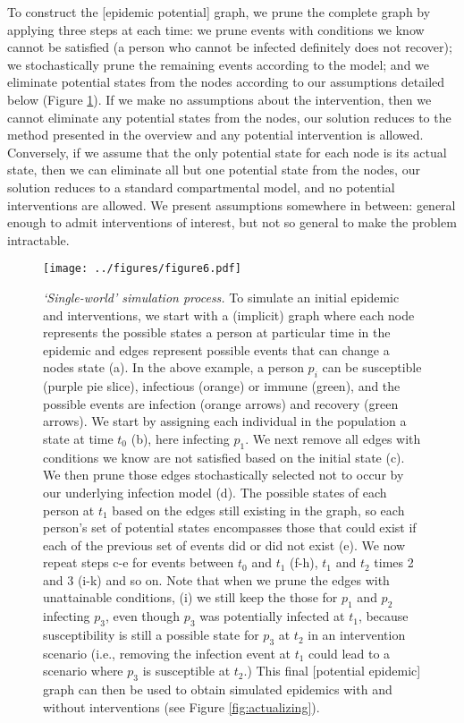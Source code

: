 \documentclass[PTRSB]{rsos}
\makeatletter
\def\checkGraphicsWidth{\ifdim\Gin@nat@width>\linewidth
	\tsGraphicsScaleX\linewidth\else\Gin@nat@width\fi}
\let\ts@includegraphics\includegraphics
\renewcommand{\includegraphics}[1]{\ts@includegraphics[width=\checkGraphicsWidth]{#1}}
\makeatother
\begin{document}
\begin{multicols}{2}
To construct the [epidemic potential] graph, we prune the complete graph by applying three steps at each time: we prune events with conditions we know cannot be satisfied (a person who cannot be infected definitely does not recover); we stochastically prune the remaining events according to the model; and we eliminate potential states from the nodes according to our assumptions detailed below (Figure \ref{fig:pruning}).
If we make no assumptions about the intervention, then we cannot eliminate any potential states from the nodes, our solution reduces to the method presented in the overview and any potential intervention is allowed.
Conversely, if we assume that the only potential state for each node is its actual state, then we can eliminate all but one potential state from the nodes, our solution reduces to a standard compartmental model, and no potential interventions are allowed.
We present assumptions somewhere in between: general enough to admit interventions of interest, but not so general to make the problem intractable.

\begin{figure}[hp]
\texttt{[image: ../figures/figure6.pdf]}
\caption{\textit{‘Single-world’ simulation process.}
  To simulate an initial epidemic and interventions, we start with a (implicit) graph where each node represents the possible states a person at particular time in the epidemic and edges represent possible events that can change a nodes state (a).
  In the above example, a person $p_i$ can be susceptible (purple pie slice), infectious (orange) or immune (green), and the possible events are infection (orange arrows) and recovery (green arrows).
  We start by assigning each individual in the population a state at time $t_0$ (b), here infecting $p_1$.
  We next remove all edges with conditions we know are not satisfied based on the initial state (c).
  We then prune those edges stochastically selected not to occur by our underlying infection model (d).
  The possible states of each person at $t_1$ based on the edges still existing in the graph, so each person’s set of potential states encompasses those that could exist if each of the previous set of events did or did not exist (e).
  We now repeat steps c-e for events between $t_0$ and $t_1$ (f-h), $t_1$ and $t_2$ times 2 and 3 (i-k) and so on.
  Note that when we prune the edges with unattainable conditions, (i) we still keep the those for $p_1$ and $p_2$ infecting $p_3$, even though $p_3$ was potentially infected at $t_1$, because susceptibility is still a possible state for $p_3$ at $t_2$ in an intervention scenario (i.e., removing the infection event at $t_1$ could lead to a scenario where $p_3$ is susceptible at $t_2$.)
  This final [potential epidemic] graph can then be used to obtain simulated epidemics with and without interventions (see Figure \ref{fig:actualizing}).
}
\label{fig:pruning}
\end{figure}


\end{multicols}
\end{document}
